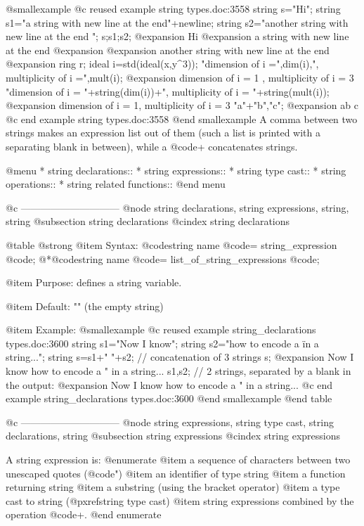 {{{{{{@smallexample
@c reused example string types.doc:3558 
  string s="Hi";
  string s1="a string with new line at the end"+newline;
  string s2="another string with new line at the end
  ";
  s;s1;s2;
@expansion{} Hi
@expansion{} a string with new line at the end
@expansion{} 
@expansion{} another string with new line at the end
@expansion{}   
  ring r; ideal i=std(ideal(x,y^3));
  "dimension of i =",dim(i),", multiplicity of i =",mult(i);
@expansion{} dimension of i = 1 , multiplicity of i = 3
  "dimension of i = "+string(dim(i))+", multiplicity of i = "+string(mult(i));
@expansion{} dimension of i = 1, multiplicity of i = 3
  "a"+"b","c";
@expansion{} ab c
@c end example string types.doc:3558
@end smallexample
A comma between two strings makes an expression list out of them
(such a list is printed with a separating blank in between),
while a @code{+} concatenates strings.

@menu
* string declarations::
* string expressions::
* string type cast::
* string operations::
* string related functions::
@end menu

@c ------------------------------
@node string declarations, string expressions, string, string
@subsection string declarations
@cindex string declarations

@table @strong
@item Syntax:
@code{string} name @code{=} string_expression @code{;}
@*@code{string} name @code{=} list_of_string_expressions @code{;}

@item Purpose:
defines a string variable.

@item Default:
"" (the empty string)

@item Example:
@smallexample
@c reused example string_declarations types.doc:3600 
  string s1="Now I know";
  string s2="how to encode a \" in a string...";
  string s=s1+" "+s2; // concatenation of 3 strings
  s;
@expansion{} Now I know how to encode a " in a string...
  s1,s2;   // 2 strings, separated by a blank in the output:
@expansion{} Now I know how to encode a " in a string...
@c end example string_declarations types.doc:3600
@end smallexample
@end table

@c ------------------------------
@node string expressions, string type cast, string declarations, string
@subsection string expressions
@cindex string expressions

A string expression is:
@enumerate
@item
a sequence of characters between two unescaped quotes (@code{"})
@item
an identifier of type string
@item
a function returning string
@item
a substring (using the bracket operator)
@item
a type cast to string (@pxref{string type cast})
@item
string expressions combined by the operation @code{+}.
@end enumerate

}}}}}}
